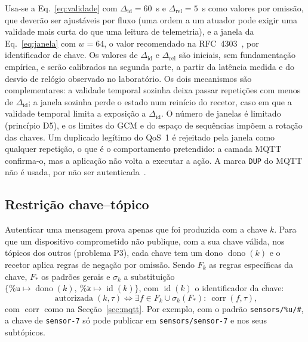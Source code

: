 Usa-se a Eq.~\eqref{eq:validade} com $\Delta_{\mathrm{id}} = 60$~s e $\Delta_{\mathrm{rel}} = 5$~s como
valores por omissão, que deverão ser ajustáveis por fluxo (uma ordem a um atuador pode exigir uma
validade mais curta do que uma leitura de telemetria), e a
janela da Eq.~\eqref{eq:janela} com $w = 64$, o valor recomendado na RFC~4303~\cite[§3.4.3]{rfc4303},
por identificador de chave. Os valores de $\Delta_{\mathrm{id}}$ e $\Delta_{\mathrm{rel}}$ são iniciais, sem
fundamentação empírica, e serão calibrados na segunda parte, a partir da latência
medida e do desvio de relógio observado no laboratório. Os dois
mecanismos são complementares: a validade temporal sozinha deixa passar repetições
com menos de $\Delta_{\mathrm{id}}$; a janela sozinha perde o estado num reinício do recetor,
caso em que a validade temporal limita a exposição a $\Delta_{\mathrm{id}}$. O número de
janelas é limitado (princípio D5), e os limites do GCM e do espaço de sequências
impõem a rotação das chaves. Um duplicado legítimo do QoS~1 é rejeitado pela
janela como qualquer repetição, o que é o comportamento pretendido: a camada MQTT
confirma-o, mas a aplicação não volta a executar a ação. A marca \texttt{DUP} do
MQTT não é usada, por não ser autenticada~\cite[§3.3.1.1]{oasis-mqtt311}.

\subsection{Restrição chave--tópico}
\label{sec:ligacao}

Autenticar uma mensagem prova apenas que foi produzida com a chave $k$. Para que um
dispositivo comprometido não publique, com a sua chave válida, nos tópicos dos
outros (problema P3), cada chave tem um dono $\operatorname{dono}(k)$ e o recetor
aplica regras de negação por omissão. Sendo $F_k$ as regras específicas da chave,
$F_\ast$ os padrões gerais e $\sigma_k$ a substituição
$\{\texttt{\%u} \mapsto \operatorname{dono}(k),\ \texttt{\%k} \mapsto \operatorname{id}(k)\}$,
com $\operatorname{id}(k)$ o identificador da chave:
\begin{equation}
  \operatorname{autorizada}(k, \tau) \iff
  \exists f \in F_k \cup \sigma_k(F_\ast) :\ \operatorname{corr}(f, \tau),
  \label{eq:ligacao}
\end{equation}
com $\operatorname{corr}$ como na Secção~\ref{sec:mqtt}. Por exemplo, com o padrão
\texttt{sensors/\%u/\#}, a chave de \texttt{sensor-7} só pode publicar em
\texttt{sensors/sensor-7} e nos seus subtópicos.

